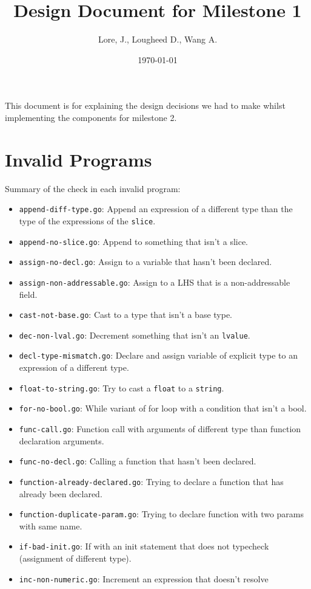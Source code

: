\documentclass[11pt]{article}
\author{Lore, J., Lougheed D., Wang A.}
\date{\today}
\title{Design Document for Milestone 1}
\begin{document}
\maketitle
\tableofcontents

This document is for explaining the design decisions we had to make
whilst implementing the components for milestone 2.
\newpage
\section{Invalid Programs}
\label{sec:org66751cf}
Summary of the check in each invalid program:
\begin{itemize}
\item \texttt{append-diff-type.go}: Append an expression of a different type than
the type of the expressions of the \texttt{slice}.
\item \texttt{append-no-slice.go}: Append to something that isn't a slice.
\item \texttt{assign-no-decl.go}: Assign to a variable that hasn't been declared.
\item \texttt{assign-non-addressable.go}: Assign to a LHS that is a
non-addressable field.
\item \texttt{cast-not-base.go}: Cast to a type that isn't a base type.
\item \texttt{dec-non-lval.go}: Decrement something that isn't an \texttt{lvalue}.
\item \texttt{decl-type-mismatch.go}: Declare and assign variable of explicit type
to an expression of a different type.
\item \texttt{float-to-string.go}: Try to cast a \texttt{float} to a \texttt{string}.
\item \texttt{for-no-bool.go}: While variant of for loop with a condition that isn't
a bool.
\item \texttt{func-call.go}: Function call with arguments of different type than
function declaration arguments.
\item \texttt{func-no-decl.go}: Calling a function that hasn't been declared.
\item \texttt{function-already-declared.go}: Trying to declare a function that
has already been declared.
\item \texttt{function-duplicate-param.go}: Trying to declare function with two
params with same name.
\item \texttt{if-bad-init.go}: If with an init statement that does not typecheck
(assignment of different type).
\item \texttt{inc-non-numeric.go}: Increment an expression that doesn't resolve

\end{itemize}
\end{document}
